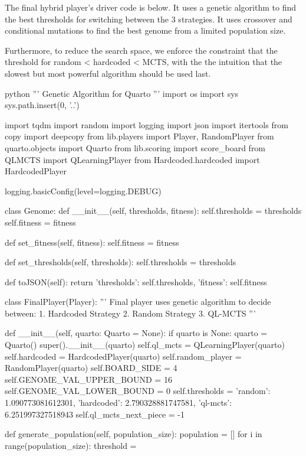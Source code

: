 The final hybrid player's driver code is below. It uses a genetic algorithm to find the best thresholds for switching between the 3 strategies. It uses crossover and conditional mutations to find the best genome from a limited population size.

Furthermore, to reduce the search space, we enforce the constraint that the threshold for random < hardcoded < MCTS, with the the intuition that the slowest but most powerful algorithm should be used last.

\begin{mintedbox}{python}
'''
Genetic Algorithm for Quarto
'''
import os
import sys
sys.path.insert(0, '..')

import tqdm
import random
import logging
import json
import itertools
from copy import deepcopy
from lib.players import Player, RandomPlayer
from quarto.objects import Quarto
from lib.scoring import score_board
from QLMCTS import QLearningPlayer
from Hardcoded.hardcoded import HardcodedPlayer

logging.basicConfig(level=logging.DEBUG)

class Genome:
    def __init__(self, thresholds, fitness):
        self.thresholds = thresholds
        self.fitness = fitness

    def set_fitness(self, fitness):
        self.fitness = fitness

    def set_thresholds(self, thresholds):
        self.thresholds = thresholds

    def toJSON(self):
        return {
            'thresholds': self.thresholds,
            'fitness': self.fitness
        }


class FinalPlayer(Player):
    '''
    Final player uses genetic algorithm to decide between:
    1. Hardcoded Strategy
    2. Random Strategy
    3. QL-MCTS
    '''

    def __init__(self, quarto: Quarto = None):
        if quarto is None:
            quarto = Quarto()
        super().__init__(quarto)
        self.ql_mcts = QLearningPlayer(quarto)
        self.hardcoded = HardcodedPlayer(quarto)
        self.random_player = RandomPlayer(quarto)
        self.BOARD_SIDE = 4
        self.GENOME_VAL_UPPER_BOUND = 16
        self.GENOME_VAL_LOWER_BOUND = 0
        self.thresholds = {
            'random': 1.090773081612301,
            'hardcoded': 2.790328881747581,
            'ql-mcts': 6.251997327518943
        }
        self.ql_mcts_next_piece = -1

    def generate_population(self, population_size):
        population = []
        for i in range(population_size):
            threshold = {}


\end{mintedbox}
